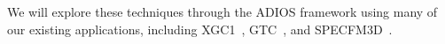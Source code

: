 



We will explore these techniques through the ADIOS
framework using many of our existing applications, including
XGC1~\cite{chang2006integrated}, GTC~\cite{klasky2003grid}, and SPECFM3D~\cite{SPECFEM3D}.

